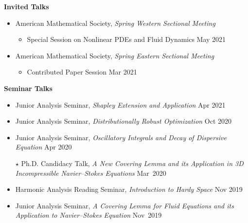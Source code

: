 \documentclass[margin,line]{res}
\begin{document}
\begin{resume}
\begin{itemize}[leftmargin=0.15in, label=$\sqbullet$]
\end{itemize}

\nvspace 
{\bf Invited Talks}
\vvspace

\begin{itemize}[leftmargin=0.15in, label=$\sqbullet$]
        
    \item American Mathematical Society, \textit{Spring Western Sectional Meeting} 
        \nvspace
        \begin{itemize}
            \item Special Session on Nonlinear PDEs and Fluid Dynamics \hfill May 2021
        \end{itemize}
    
    \item American Mathematical Society, \textit{Spring Eastern Sectional Meeting}
        \nvspace 
        \begin{itemize}
            \item Contributed Paper Session \hfill Mar 2021
        \end{itemize}
    
\end{itemize}

\nvspace 
{\bf Seminar Talks}
\vvspace

\begin{itemize}[leftmargin=0.15in, label=$\sqbullet$]
    
    \item Junior Analysis Seminar,
    \textit{Shapley Extension and Application}
    \hfill Apr 2021
    
    \item Junior Analysis Seminar, 
    \textit{Distributionally Robust Optimization}
    \hfill Oct 2020
    
    \item Junior Analysis Seminar, 
    \textit{Oscillatory Integrals and Decay of Dispersive Equation }
    \hfill Apr 2020

    \item[$\star$] Ph.D. Candidacy Talk,
    \textit{A New Covering Lemma and its Application in 3D Incompressible Navier--Stokes Equations}
    \hfill Mar~2020

    \item Harmonic Analysis Reading Seminar,
    \textit{Introduction to Hardy Space}
    \hfill Nov 2019
    
    \item Junior Analysis Seminar, 
    \textit{A Covering Lemma for Fluid Equations and its Application to Navier--Stokes Equation} \hfill Nov~2019
    

\end{itemize}
\end{resume}
\end{document}
